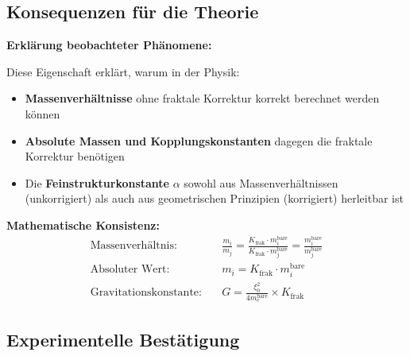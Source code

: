 	\subsection{Konsequenzen für die Theorie}
	
	\begin{derivation}
		\textbf{Erklärung beobachteter Phänomene:}
		
		Diese Eigenschaft erklärt, warum in der Physik:
		
		\begin{itemize}
			\item \textbf{Massenverhältnisse} ohne fraktale Korrektur korrekt berechnet werden können
			\item \textbf{Absolute Massen und Kopplungskonstanten} dagegen die fraktale Korrektur benötigen
			\item Die \textbf{Feinstrukturkonstante} $\alpha$ sowohl aus Massenverhältnissen (unkorrigiert) als auch aus geometrischen Prinzipien (korrigiert) herleitbar ist
		\end{itemize}
		
		\textbf{Mathematische Konsistenz:}
		\begin{align}
			\text{Massenverhältnis:} &\quad \frac{m_i}{m_j} = \frac{K_{\text{frak}} \cdot m_i^{\text{bare}}}{K_{\text{frak}} \cdot m_j^{\text{bare}}} = \frac{m_i^{\text{bare}}}{m_j^{\text{bare}}} \\
			\text{Absoluter Wert:} &\quad m_i = K_{\text{frak}} \cdot m_i^{\text{bare}} \\
			\text{Gravitationskonstante:} &\quad G = \frac{\xi_0^2}{4 m_e^{\text{bare}}} \times K_{\text{frak}}
		\end{align}
	\end{derivation}
	
	\subsection{Experimentelle Bestätigung}
	
